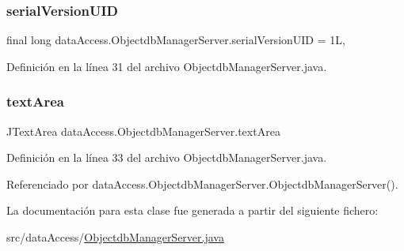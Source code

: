 \subsubsection{\texorpdfstring{serialVersionUID}{serialVersionUID}}
{\footnotesize\ttfamily final long data\+Access.\+Objectdb\+Manager\+Server.\+serial\+Version\+U\+ID = 1L\hspace{0.3cm}{\ttfamily [static]}, {\ttfamily [private]}}



Definición en la línea 31 del archivo Objectdb\+Manager\+Server.\+java.

\mbox{\label{classdata_access_1_1_objectdb_manager_server_ab739ebdf3a077579c9af7a881c620fd4}} 
\subsubsection{\texorpdfstring{textArea}{textArea}}
{\footnotesize\ttfamily J\+Text\+Area data\+Access.\+Objectdb\+Manager\+Server.\+text\+Area\hspace{0.3cm}{\ttfamily [package]}}



Definición en la línea 33 del archivo Objectdb\+Manager\+Server.\+java.



Referenciado por data\+Access.\+Objectdb\+Manager\+Server.\+Objectdb\+Manager\+Server().



La documentación para esta clase fue generada a partir del siguiente fichero\+:\begin{DoxyCompactItemize}
\item 
src/data\+Access/\mbox{\hyperlink{_objectdb_manager_server_8java}{Objectdb\+Manager\+Server.\+java}}\end{DoxyCompactItemize}
